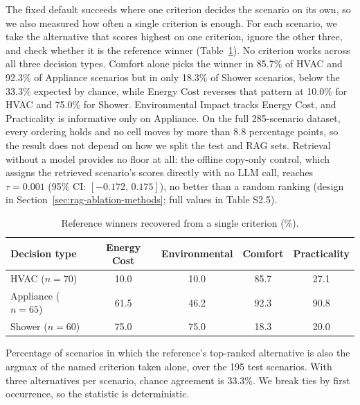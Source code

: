 \documentclass[final,3p,times]{elsarticle}
\begin{document}
The fixed default succeeds where one criterion decides the scenario on its own, so we also measured how often a single criterion is enough. For each scenario, we take the alternative that scores highest on one criterion, ignore the other three, and check whether it is the reference winner (Table~\ref{tab:single-criterion-recovery}). No criterion works across all three decision types. Comfort alone picks the winner in 85.7\% of HVAC and 92.3\% of Appliance scenarios but in only 18.3\% of Shower scenarios, below the 33.3\% expected by chance, while Energy Cost reverses that pattern at 10.0\% for HVAC and 75.0\% for Shower. Environmental Impact tracks Energy Cost, and Practicality is informative only on Appliance. On the full 285-scenario dataset, every ordering holds and no cell moves by more than 8.8 percentage points, so the result does not depend on how we split the test and RAG sets. Retrieval without a model provides no floor at all: the offline copy-only control, which assigns the retrieved scenario's scores directly with no LLM call, reaches $\tau = 0.001$ (95\% CI: $[-0.172,\, 0.175]$), no better than a random ranking (design in Section~\ref{sec:rag-ablation-methods}; full values in Table S2.5).

\begin{table}[htbp]
\caption{Reference winners recovered from a single criterion (\%).}
\label{tab:single-criterion-recovery}
\centering
\begin{threeparttable}
  \centering
  \footnotesize
  \begin{tabular}{lcccc}
    \toprule
    Decision type & Energy Cost & Environmental & Comfort & Practicality \\
    \midrule
    HVAC ($n=70$) & 10.0 & 10.0 & 85.7 & 27.1 \\
    Appliance ($n=65$) & 61.5 & 46.2 & 92.3 & 90.8 \\
    Shower ($n=60$) & 75.0 & 75.0 & 18.3 & 20.0 \\
    \bottomrule
  \end{tabular}
  \begin{tablenotes}
    \item Percentage of scenarios in which the reference's top-ranked alternative is also the argmax of the named criterion taken alone, over the 195 test scenarios. With three alternatives per scenario, chance agreement is 33.3\%. We break ties by first occurrence, so the statistic is deterministic.
  \end{tablenotes}
\end{threeparttable}
\end{table}
\end{document}
